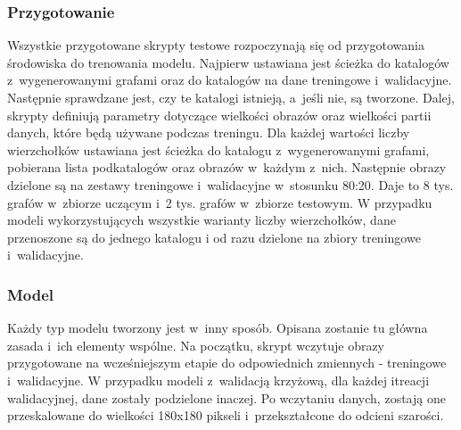 \subsubsection{Przygotowanie}
Wszystkie przygotowane skrypty testowe rozpoczynają się od przygotowania środowiska do trenowania modelu.
Najpierw ustawiana jest ścieżka do katalogów z~wygenerowanymi grafami oraz do katalogów na dane treningowe i~walidacyjne.
Następnie sprawdzane jest, czy te katalogi istnieją, a~jeśli nie, są tworzone.
Dalej, skrypty definiują parametry dotyczące wielkości obrazów oraz wielkości partii danych, które będą używane podczas treningu.
Dla każdej wartości liczby wierzchołków ustawiana jest ścieżka do katalogu z~wygenerowanymi grafami,
pobierana lista podkatalogów oraz obrazów w~każdym z~nich.
Następnie obrazy dzielone są na zestawy treningowe i~walidacyjne w~stosunku 80:20.
Daje to 8 tys. grafów w~zbiorze uczącym i~2 tys. grafów w~zbiorze testowym.
W przypadku modeli wykorzystujących wszystkie warianty liczby wierzchołków, dane przenoszone są do jednego katalogu
i od razu dzielone na zbiory treningowe i~walidacyjne.

\subsubsection{Model}
Każdy typ modelu tworzony jest w~inny sposób. Opisana zostanie tu główna zasada i~ich elementy wspólne.
Na początku, skrypt wczytuje obrazy przygotowane na wcześniejszym etapie do odpowiednich zmiennych - treningowe i~walidacyjne.
W przypadku modeli z~walidacją krzyżową, dla każdej itreacji walidacyjnej, dane zostały podzielone inaczej.
Po wczytaniu danych, zostają one przeskalowane do wielkości 180x180 pikseli i~przekształcone do odcieni szarości.

